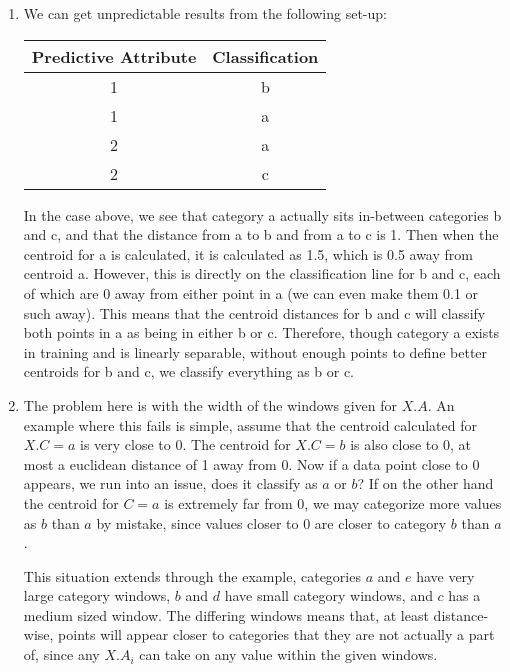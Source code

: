 \documentclass{article}
\begin{document}
\begin{enumerate}
\begin{enumerate}
			\item We can get unpredictable results from the following set-up:
			
			\begin{center}
				\begin{tabular}{|c|c|}
					\hline
					Predictive Attribute & Classification \\
					\hline
					1 & b\\
					\hline
					1 & a \\
					\hline
					2 & a \\
					\hline
					2 & c \\
					\hline
				\end{tabular}
			\end{center}
			
			In the case above, we see that category a actually sits in-between categories b and c, and that the distance from a to b and from a to c is 1.  Then when the centroid for a is calculated, it is calculated as 1.5, which is 0.5 away from centroid a.  However, this is directly on the classification line for b and c, each of which are 0 away from either point in a (we can even make them 0.1 or such away).  This means that the centroid distances for b and c will classify both points in a as being in either b or c.  Therefore, though category a exists in training and is linearly separable, without enough points to define better centroids for b and c, we classify everything as b or c.
			
			\item The problem here is with the width of the windows given for $X.A$.  An example where this fails is simple, assume that the centroid calculated for $X.C = a$ is very close to $0$.  The centroid for $X.C = b$ is also close to $0$, at most a euclidean distance of 1 away from 0.  Now if a data point close to $0$ appears, we run into an issue, does it classify as $a$ or $b$?  If on the other hand the centroid for $C=a$ is extremely far from 0, we may categorize more values as $b$ than $a$ by mistake, since values closer to 0 are closer to category $b$ than $a$.
			
			This situation extends through the example, categories $a$ and $e$ have very large category windows, $b$ and $d$ have small category windows, and $c$ has a medium sized window.  The differing windows means that, at least distance-wise, points will appear closer to categories that they are not actually a part of, since any $X.A_i$ can take on any value within the given windows.
			

\end{enumerate}
\end{enumerate}
\end{document}
